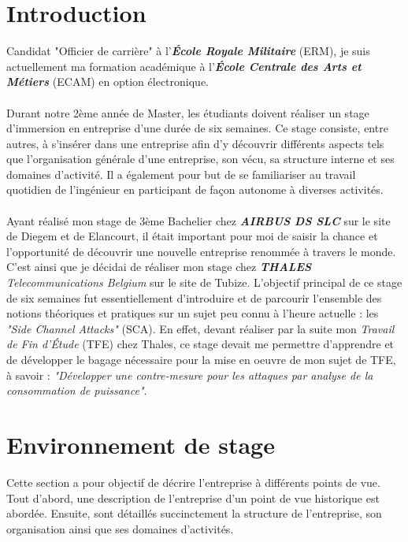 \documentclass[10pt, oneside, a4paper]{article}
\begin{document}
\tableofcontents
\newpage


\section*{Introduction}

Candidat "Officier de carrière" à l’\textbf{\textit{École Royale Militaire}} (ERM), je suis actuellement ma formation académique à l’\textbf{\textit{École Centrale des Arts et Métiers}} (ECAM) en option électronique. \\ \\
Durant notre 2ème année de Master, les étudiants doivent réaliser un stage d’immersion en entreprise d’une durée de six semaines. Ce stage consiste, entre autres, à s’insérer dans une entreprise afin d’y découvrir différents aspects tels que l’organisation générale d’une entreprise, son vécu, sa structure interne et ses domaines d'activité. Il a également pour but de se familiariser au travail quotidien de l’ingénieur en participant de façon autonome à diverses activités. \\ \\
Ayant réalisé mon stage de 3ème Bachelier chez \textbf{\textit{AIRBUS DS SLC}} sur le site de Diegem et de Elancourt, il était important pour moi de saisir la chance et l’opportunité de découvrir une nouvelle entreprise renommée à travers le monde. C'est ainsi que je décidai de réaliser mon stage chez \textit{\textbf{THALES} Telecommunications Belgium} sur le site de Tubize. L'objectif principal de ce stage de six semaines fut essentiellement d'introduire et de parcourir l'ensemble des notions théoriques et pratiques sur un sujet peu connu à l'heure actuelle : les \textit{"Side Channel Attacks"} (SCA). En effet, devant réaliser par la suite mon \textit{Travail de Fin d'Étude} (TFE) chez Thales, ce stage devait me permettre d'apprendre et de développer le bagage nécessaire pour la mise en oeuvre de mon sujet de TFE, à savoir : \textit{"Développer une contre-mesure pour les attaques par analyse de la consommation de puissance"}.

\newpage

\section{Environnement de stage}
Cette section a pour objectif de décrire l'entreprise à différents points de vue. Tout d'abord, une description de l'entreprise d'un point de vue historique est abordée. Ensuite, sont détaillés succinctement la structure de l'entreprise, son organisation ainsi que ses domaines d'activités.
\end{document}
